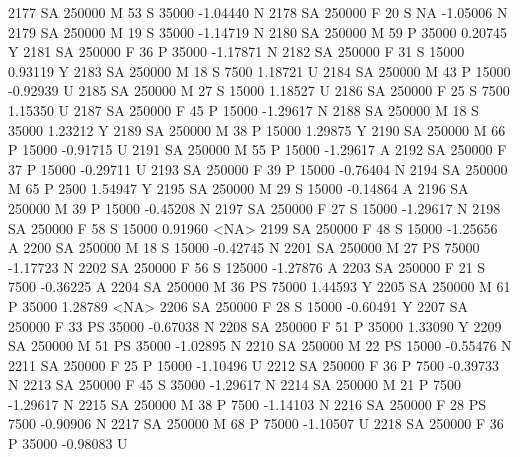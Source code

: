 \documentclass{article}
\begin{document}
\begin{Schunk}
\begin{Soutput}
2177     SA     250000   M  53         S  35000  -1.04440    N
2178     SA     250000   F  20         S     NA  -1.05006    N
2179     SA     250000   M  19         S  35000  -1.14719    N
2180     SA     250000   M  59         P  35000   0.20745    Y
2181     SA     250000   F  36         P  35000  -1.17871    N
2182     SA     250000   F  31         S  15000   0.93119    Y
2183     SA     250000   M  18         S   7500   1.18721    U
2184     SA     250000   M  43         P  15000  -0.92939    U
2185     SA     250000   M  27         S  15000   1.18527    U
2186     SA     250000   F  25         S   7500   1.15350    U
2187     SA     250000   F  45         P  15000  -1.29617    N
2188     SA     250000   M  18         S  35000   1.23212    Y
2189     SA     250000   M  38         P  15000   1.29875    Y
2190     SA     250000   M  66         P  15000  -0.91715    U
2191     SA     250000   M  55         P  15000  -1.29617    A
2192     SA     250000   F  37         P  15000  -0.29711    U
2193     SA     250000   F  39         P  15000  -0.76404    N
2194     SA     250000   M  65         P   2500   1.54947    Y
2195     SA     250000   M  29         S  15000  -0.14864    A
2196     SA     250000   M  39         P  15000  -0.45208    N
2197     SA     250000   F  27         S  15000  -1.29617    N
2198     SA     250000   F  58         S  15000   0.91960 <NA>
2199     SA     250000   F  48         S  15000  -1.25656    A
2200     SA     250000   M  18         S  15000  -0.42745    N
2201     SA     250000   M  27        PS  75000  -1.17723    N
2202     SA     250000   F  56         S 125000  -1.27876    A
2203     SA     250000   F  21         S   7500  -0.36225    A
2204     SA     250000   M  36        PS  75000   1.44593    Y
2205     SA     250000   M  61         P  35000   1.28789 <NA>
2206     SA     250000   F  28         S  15000  -0.60491    Y
2207     SA     250000   F  33        PS  35000  -0.67038    N
2208     SA     250000   F  51         P  35000   1.33090    Y
2209     SA     250000   M  51        PS  35000  -1.02895    N
2210     SA     250000   M  22        PS  15000  -0.55476    N
2211     SA     250000   F  25         P  15000  -1.10496    U
2212     SA     250000   F  36         P   7500  -0.39733    N
2213     SA     250000   F  45         S  35000  -1.29617    N
2214     SA     250000   M  21         P   7500  -1.29617    N
2215     SA     250000   M  38         P   7500  -1.14103    N
2216     SA     250000   F  28        PS   7500  -0.90906    N
2217     SA     250000   M  68         P  75000  -1.10507    U
2218     SA     250000   F  36         P  35000  -0.98083    U

\end{Soutput}
\end{Schunk}
\end{document}
